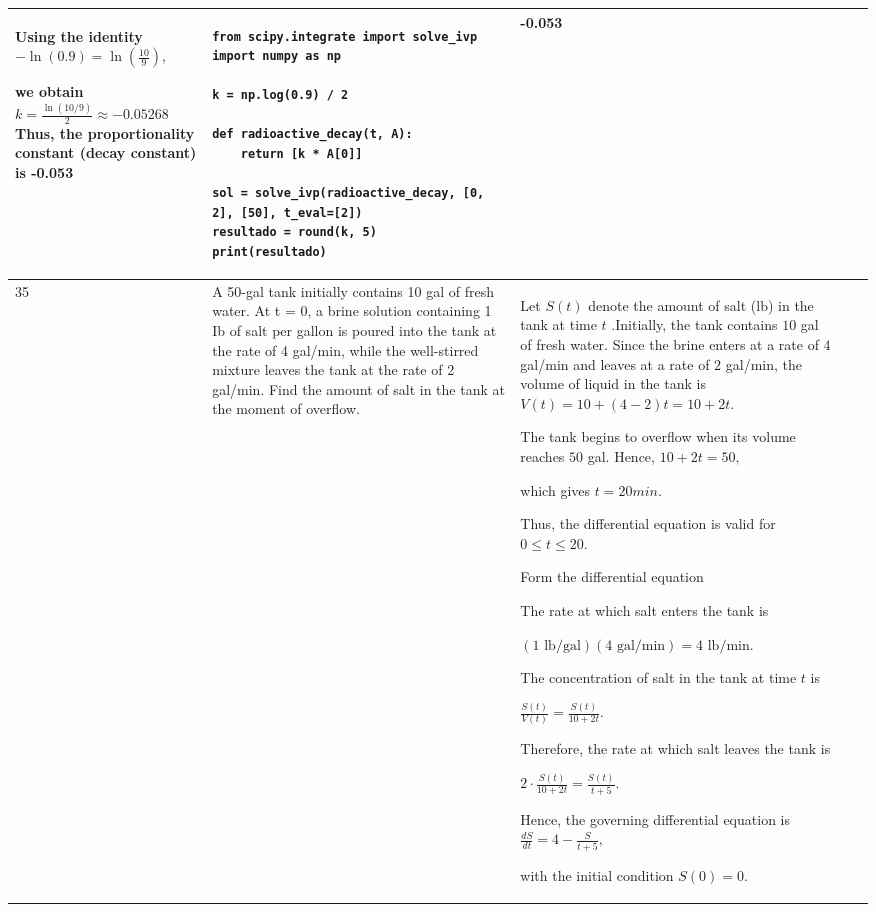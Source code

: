 \documentclass[a4paper,12pt]{article}
\begin{document}
\begin{longtable}{|p{0.3cm}|p{}|p{10cm}|p{}|p{1.5cm}|}
Using the identity
$-\ln(0.9)=\ln\left(\frac{10}{9}\right),$

we obtain  $k=\frac{\ln(10/9)}{2}\approx -0.05268 $
Thus, the proportionality constant (decay constant) is -0.053



               &\begin{verbatim}
from scipy.integrate import solve_ivp
import numpy as np

k = np.log(0.9) / 2

def radioactive_decay(t, A):
    return [k * A[0]]

sol = solve_ivp(radioactive_decay, [0, 2], [50], t_eval=[2])
resultado = round(k, 5)
print(resultado)
\end{verbatim}&   -0.053           \\ \hline
      35         &    A 50-gal tank initially contains 10 gal of fresh water. At t = 0, a brine solution containing 1 Ib of salt per gallon is poured into the tank at the rate of 4 gal/min, while the well-stirred mixture leaves the tank at the rate of 2 gal/min. Find the amount of salt in the tank at the moment of overflow.             &  Let $S(t)$ denote the amount of salt (lb) in the tank at time $t$ .Initially, the tank contains $10$ gal of fresh water. Since the brine enters at a rate of $4$ gal/min and leaves at a rate of $2$ gal/min, the volume of liquid in the tank is $
V(t)=10+(4-2)t=10+2t.
$

The tank begins to overflow when its volume reaches $50$ gal. Hence, $10+2t=50,$

which gives  $t=20  min.$

Thus, the differential equation is valid for $0\le t\le20$.

Form the differential equation

The rate at which salt enters the tank is

$
(1\text{ lb/gal})(4\text{ gal/min})=4\text{ lb/min}.
$

The concentration of salt in the tank at time $t$ is

$
\frac{S(t)}{V(t)}
=\frac{S(t)}{10+2t}.
$

Therefore, the rate at which salt leaves the tank is

$
2\cdot\frac{S(t)}{10+2t}
=\frac{S(t)}{t+5}.
$

Hence, the governing differential equation is $
\frac{dS}{dt}=4-\frac{S}{t+5},
$

with the initial condition $S(0)=0.$


\end{longtable}
\end{document}
